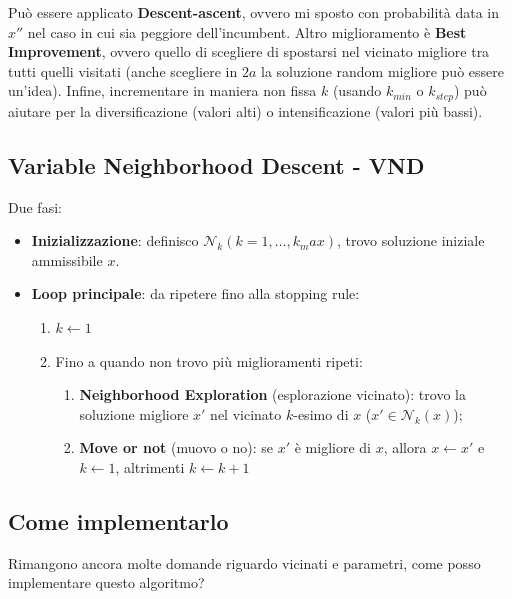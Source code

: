 Può essere applicato \textbf{Descent-ascent}, ovvero mi sposto con probabilità data in $x''$ nel caso in cui sia peggiore dell'incumbent. Altro miglioramento è \textbf{Best Improvement}, ovvero quello di scegliere di spostarsi nel vicinato migliore tra tutti quelli visitati (anche scegliere in $2a$ la soluzione random migliore può essere un'idea). Infine, incrementare in maniera non fissa $k$ (usando $k_{min}$ o $k_{step}$) può aiutare per la diversificazione (valori alti) o intensificazione (valori più bassi).


\subsection{Variable Neighborhood Descent - VND}
Due fasi:
\begin{itemize}
	\item \textbf{Inizializzazione}: definisco $\mathcal{N}_k(k=1,\dots,k_max)$, trovo soluzione iniziale ammissibile $x$.
	\item \textbf{Loop principale}: da ripetere fino alla stopping rule:
	\begin{enumerate}
		\item $k\leftarrow 1$
		\item Fino a quando non trovo più miglioramenti ripeti:
		\begin{enumerate}
			\item \textbf{Neighborhood Exploration} (esplorazione vicinato): trovo la soluzione migliore $x'$ nel vicinato $k$-esimo di $x$ ($x'\in \mathcal{N}_k(x)$);
			\item \textbf{Move or not} (muovo o no): se $x'$ è migliore di $x$, allora $x\leftarrow x'$ e $k\leftarrow 1$, altrimenti $k\leftarrow k+1$
		\end{enumerate}
	\end{enumerate}
\end{itemize}

\subsection{Come implementarlo}
Rimangono ancora molte domande riguardo vicinati e parametri, come posso implementare questo algoritmo? 

